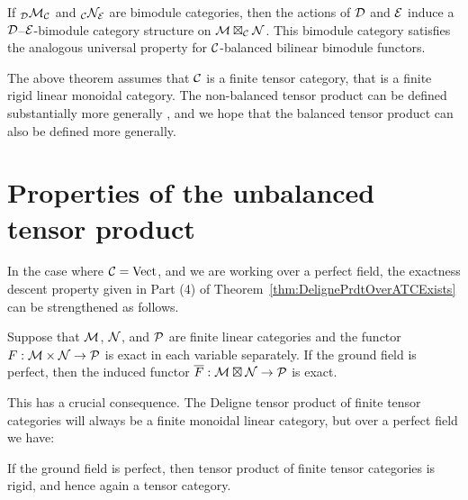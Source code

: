 \documentclass{amsart}
\begin{document}
\begin{remark}
	If ${}_{\mathcal D}\mathcal M_{\mathcal C}$ and ${}_{\mathcal C}\mathcal N_{\mathcal E}$ are bimodule categories, then the actions of $\mathcal D$ and $\mathcal E$ induce a $\mathcal D$--$\mathcal E$-bimodule category structure on $\mathcal M \boxtimes_{\mathcal C} \mathcal N$. This bimodule category satisfies the analogous universal property for $\mathcal C$-balanced bilinear bimodule functors.
\end{remark}

\begin{remark}
The above theorem assumes that $\mathcal C$ is a finite tensor category, that is a finite rigid linear monoidal category.  The non-balanced tensor product can be defined substantially more generally \cite{1212.1545}, and we hope that the balanced tensor product can also be defined more generally.
\end{remark}

\appendix
\section{Properties of the unbalanced tensor product}
  

In the case where $\mathcal C = \mathrm{Vect}$, and we are working over a perfect field, the exactness descent property given in Part (4) of Theorem~\ref{thm:DelignePrdtOverATCExists} can be strengthened as follows.

\begin{lemma}[{\cite[Pr.~5.13(vi)]{MR1106898}}]%
	Suppose that $\mathcal M$, $\mathcal N$, and $\mathcal P$ are finite linear categories and the functor $F: \mathcal M \times \mathcal N \to \mathcal P$ is exact in each variable separately. If the ground field is perfect, then the induced functor $\overline{F}: \mathcal M \boxtimes \mathcal N \to \mathcal P$ is exact. 
\end{lemma} 

This has a crucial consequence. The Deligne tensor product of finite tensor categories will always be a finite monoidal linear category, but over a perfect field we have:

\begin{corollary}[{\cite[Pr.~5.17]{MR1106898}}]%
	If the ground field is perfect, then tensor product of finite tensor categories is rigid, and hence again a tensor category. 
\end{corollary}
\end{document}
